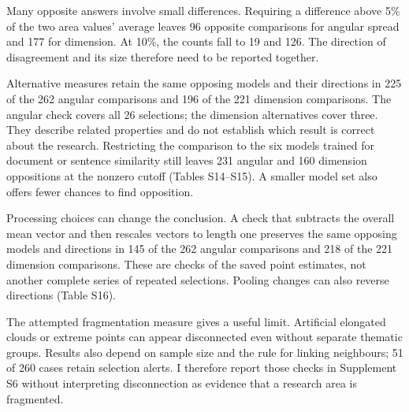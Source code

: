 Many opposite answers involve small differences. Requiring a difference above 5\% of the two area values' average leaves 96 opposite comparisons for angular spread and 177 for dimension. At 10\%, the counts fall to 19 and 126. The direction of disagreement and its size therefore need to be reported together.

Alternative measures retain the same opposing models and their directions in 225 of the 262 angular comparisons and 196 of the 221 dimension comparisons. The angular check covers all 26 selections; the dimension alternatives cover three. They describe related properties and do not establish which result is correct about the research. Restricting the comparison to the six models trained for document or sentence similarity still leaves 231 angular and 160 dimension oppositions at the nonzero cutoff (Tables S14--S15). A smaller model set also offers fewer chances to find opposition.

Processing choices can change the conclusion. A check that subtracts the overall mean vector and then rescales vectors to length one preserves the same opposing models and directions in 145 of the 262 angular comparisons and 218 of the 221 dimension comparisons. These are checks of the saved point estimates, not another complete series of repeated selections. Pooling changes can also reverse directions (Table S16).

The attempted fragmentation measure gives a useful limit. Artificial elongated clouds or extreme points can appear disconnected even without separate thematic groups. Results also depend on sample size and the rule for linking neighbours; 51 of 260 cases retain selection alerts. I therefore report those checks in Supplement S6 without interpreting disconnection as evidence that a research area is fragmented.

